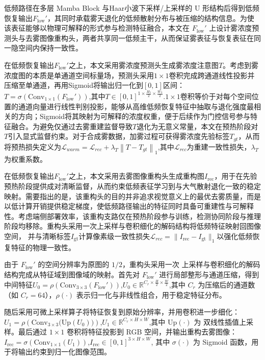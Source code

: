 低频路径在多层 Mamba Block 与Haar小波下采样/上采样的 U 形结构后得到低频恢复输出$F_{\mathrm{low}}'$，其同时承载雾天退化的低频散射分布与被压缩的结构信息。为使该表征能够以物理可解释的形式参与检测特征融合，本文在 $F_{\mathrm{low}}'$ 上设计雾浓度预测头与去雾图像重构头，两者共享同一低频主干，从而保证雾表征与恢复表征在同一隐空间内保持一致性。

在低频恢复输出$F_{\mathrm{low}}'$之上，本文采用雾浓度预测头生成雾浓度注意图$T$。考虑到雾浓度图的本质是单通道空间标量场，预测头采用$1\times1$卷积完成跨通道线性投影并压缩至单通道，再用Sigmoid将输出归一化到$[0,1]$区间：$T=\sigma\!\left(\mathrm{Conv}_{1\times1}(F_{\mathrm{low}}')\right)$,其中$T\in[0,1]^{1\times \frac{H_3}{2}\times \frac{W_3}{2}}$.$1\times1$卷积等价于对每个空间位置的通道向量进行线性判别投影，能够从高维低频恢复特征中抽取与退化强度最相关的方向；Sigmoid将其映射为可解释的浓度权重，便于后续作为门控信号参与特征融合。为避免仅通过去雾重建监督导致$T$退化为无意义常量，本文在预热阶段对$T$引入显式监督约束。对于合成雾数据，加雾过程可获得雾浓度先验标签$T_{gt}$，从而将预热损失定义为$\mathcal{L}_{warm}=\mathcal{L}_{rec}+\lambda_T \left\|T-T_{gt}\right\|_1$,其中$\mathcal{L}_{rec}$为重建一致性损失，$\lambda_T$为权重系数。

在低频恢复输出$F_{\mathrm{low}}'$之上，本文采用去雾图像重构头生成重构图$I_{\mathrm{rec}}$，用于在先验预热阶段提供成对清晰监督，从而约束低频表征学习到与大气散射退化一致的稳定映射。需要指出的是，该重构头的目的并非追求视觉意义上的最优去雾质量，而是以低计算开销提供稳定梯度，使低频路径输出的特征同时具备可重建性与可解释性。考虑端侧部署效率，该重构支路仅在预热阶段参与训练，检测协同阶段与推理阶段均移除。重构头采用一次上采样与卷积细化的解码结构将低频特征映射回图像空间，
并与清晰标签$I_{\mathrm{gt}}$计算像素级一致性损失$\mathcal{L}_{rec}=\|I_{\mathrm{rec}}-I_{\mathrm{gt}}\|_1$以强化低频恢复特征的物理一致性。



由于 $F_{\mathrm{low}}'$ 的空间分辨率为原图的 $1/2$，重构头采用一次 上采样与卷积细化的解码结构完成从特征域到图像域的映射。首先对 $F_{\mathrm{low}}'$ 进行局部整形与通道压缩，得到中间特征$U_0=\rho\!\left(\mathrm{Conv}_{3\times3}(F_{\mathrm{low}}')\right)$,$U_0\in\mathbb{R}^{C_r\times \frac{H}{2}\times \frac{W}{2}}$,其中 $C_r$ 为压缩后的通道数（如 $C_r=64$），$\rho(\cdot)$ 表示归一化与非线性组合，用于稳定特征分布。

随后采用可微上采样算子将特征恢复到原始分辨率，并用卷积进一步细化：
$U_1=\rho\!\left(\mathrm{Conv}_{3\times3}\big(\mathrm{Up}(U_0)\big)\right)$,$U_1\in\mathbb{R}^{C_r\times H\times W}$,其中 $\mathrm{Up}(\cdot)$ 为 双线性插值上采样。最后通过 $1\times1$ 卷积将特征投影到 RGB 空间，并输出重构去雾图像：$I_{\mathrm{rec}}=\sigma\!\left(\mathrm{Conv}_{1\times1}(U_1)\right)$,$I_{\mathrm{rec}}\in[0,1]^{3\times H\times W}$,
其中 $\sigma(\cdot)$ 为 Sigmoid 函数，用于将输出约束到归一化图像范围。

